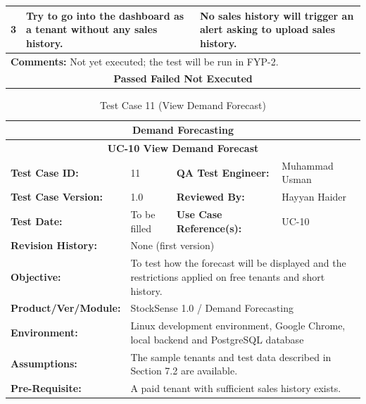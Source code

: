 \documentclass{StockSense}
\begin{document}
\begin{table}[!htbp]
{\begin{tabular}{|p{}|p{}|p{}|p{}|}
3 & Try to go into the dashboard as a tenant without any sales history. & \multicolumn{2}{p{\dimexpr0.42\textwidth+2\tabcolsep\relax}|}{No sales history will trigger an alert asking to upload sales history.} \\ \hline
\multicolumn{4}{|l|}{\textbf{Comments:} Not yet executed; the test will be run in FYP-2.} \\ \hline
\multicolumn{4}{|c|}{\textbf{Passed \quad Failed \quad Not Executed}} \\ \hline
\end{tabular}\par}
\end{table}

\begin{table}[!htbp]
\centering
\caption{Test Case 11 (View Demand Forecast)}
{\small\linespread{1}\selectfont
\begin{tabular}{|p{}|p{}|p{}|p{}|}
\hline
\multicolumn{4}{|c|}{\textbf{Demand Forecasting}} \\ \hline
\multicolumn{4}{|c|}{\textbf{UC-10 View Demand Forecast}} \\ \hline
\textbf{Test Case ID:} & 11 & \textbf{QA Test Engineer:} & Muhammad Usman \\ \hline
\textbf{Test Case Version:} & 1.0 & \textbf{Reviewed By:} & Hayyan Haider \\ \hline
\textbf{Test Date:} & To be filled & \textbf{Use Case Reference(s):} & UC-10 \\ \hline
\textbf{Revision History:} & \multicolumn{3}{p{\dimexpr0.70\textwidth+4\tabcolsep\relax}|}{None (first version)} \\ \hline
\textbf{Objective:} & \multicolumn{3}{p{\dimexpr0.70\textwidth+4\tabcolsep\relax}|}{To test how the forecast will be displayed and the restrictions applied on free tenants and short history.} \\ \hline
\textbf{Product/Ver/Module:} & \multicolumn{3}{p{\dimexpr0.70\textwidth+4\tabcolsep\relax}|}{StockSense 1.0 / Demand Forecasting} \\ \hline
\textbf{Environment:} & \multicolumn{3}{p{\dimexpr0.70\textwidth+4\tabcolsep\relax}|}{Linux development environment, Google Chrome, local backend and PostgreSQL database} \\ \hline
\textbf{Assumptions:} & \multicolumn{3}{p{\dimexpr0.70\textwidth+4\tabcolsep\relax}|}{The sample tenants and test data described in Section 7.2 are available.} \\ \hline
\textbf{Pre-Requisite:} & \multicolumn{3}{p{\dimexpr0.70\textwidth+4\tabcolsep\relax}|}{A paid tenant with sufficient sales history exists.} \\ \hline

\end{tabular}}
\end{table}
\end{document}
